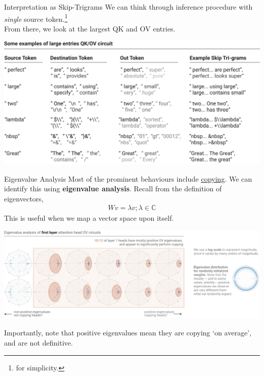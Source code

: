 \documentclass{beamer}
\begin{document}
\begin{frame}{Interpretation as Skip-Trigrams}
	We can think through inference procedure with \textit{single} source token.\footnote{for simplicity.} \pause \newline \\
	From there, we look at the largest QK and OV entries.
	\begin{center}
		\includegraphics[width=\textwidth]{img/trigram.png}
	\end{center}
\end{frame}

\begin{frame}{Eigenvalue Analysis}
	Most of the prominent behaviours include \underline{copying}. We can identify this using \textbf{eigenvalue analysis}. \pause Recall from the definition of eigenvectors,
	\begin{gather}
		Wv = \lambda v; \lambda \in \mathbb{C}
	\end{gather}
	This is useful when we map a vector space upon itself. \pause
	\begin{center}
		\includegraphics[width=\textwidth]{img/eigenspace.png}
	\end{center}
	Importantly, note that positive eigenvalues mean they are copying `on average', and are not definitive.
\end{frame}
\end{document}
